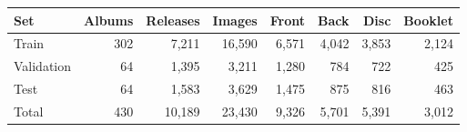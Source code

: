 \setlength{\tabcolsep}{3.5pt}
\begin{tabular}{@{}lrrrrrrr@{}}
\toprule
Set & Albums & Releases & Images & Front & Back & Disc & Booklet \\
\midrule
Train & 302 & 7,211 & 16,590 & 6,571 & 4,042 & 3,853 & 2,124 \\
Validation & 64 & 1,395 & 3,211 & 1,280 & 784 & 722 & 425 \\
Test & 64 & 1,583 & 3,629 & 1,475 & 875 & 816 & 463 \\
\midrule
Total & 430 & 10,189 & 23,430 & 9,326 & 5,701 & 5,391 & 3,012 \\
\bottomrule
\end{tabular}

